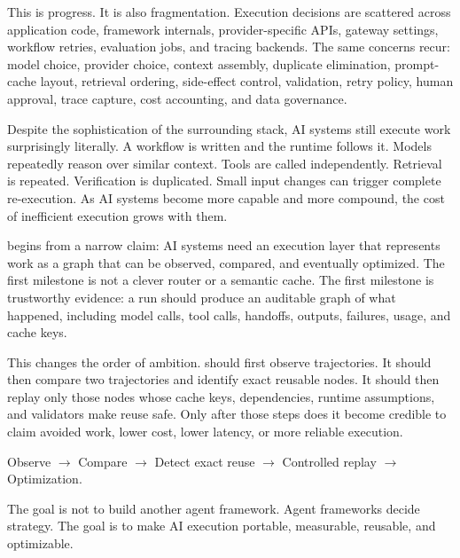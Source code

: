 This is progress. It is also fragmentation. Execution decisions are scattered across application code, framework internals, provider-specific APIs, gateway settings, workflow retries, evaluation jobs, and tracing backends. The same concerns recur: model choice, provider choice, context assembly, duplicate elimination, prompt-cache layout, retrieval ordering, side-effect control, validation, retry policy, human approval, trace capture, cost accounting, and data governance.

Despite the sophistication of the surrounding stack, AI systems still execute work surprisingly literally. A workflow is written and the runtime follows it. Models repeatedly reason over similar context. Tools are called independently. Retrieval is repeated. Verification is duplicated. Small input changes can trigger complete re-execution. As AI systems become more capable and more compound, the cost of inefficient execution grows with them.

\migaki{} begins from a narrow claim: AI systems need an execution layer that represents work as a graph that can be observed, compared, and eventually optimized. The first milestone is not a clever router or a semantic cache. The first milestone is trustworthy evidence: a run should produce an auditable graph of what happened, including model calls, tool calls, handoffs, outputs, failures, usage, and cache keys.

This changes the order of ambition. \migaki{} should first observe trajectories. It should then compare two trajectories and identify exact reusable nodes. It should then replay only those nodes whose cache keys, dependencies, runtime assumptions, and validators make reuse safe. Only after those steps does it become credible to claim avoided work, lower cost, lower latency, or more reliable execution.

\begin{center}
Observe $\rightarrow$ Compare $\rightarrow$ Detect exact reuse $\rightarrow$ Controlled replay $\rightarrow$ Optimization.
\end{center}

The goal is not to build another agent framework. Agent frameworks decide strategy. The goal is to make AI execution portable, measurable, reusable, and optimizable.
